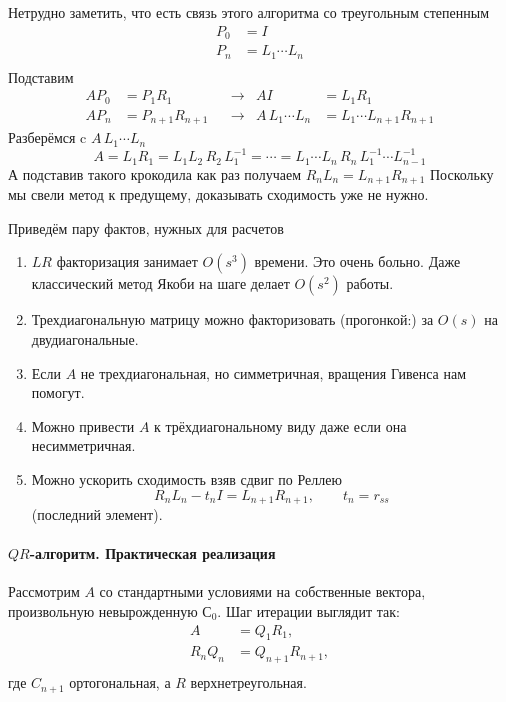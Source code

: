 \documentclass{trlnotes}
\begin{document}
Нетрудно заметить, что есть связь этого алгоритма со треугольным степенным
\[
  \begin{aligned}
    P_0 &= I \\
    P_n &= L_{1} \dotsm L_n \\
  \end{aligned}
\]
Подставим 
\[
  \begin{aligned}
    A P_0 &= P_1 R_1         & &\to& A I &= L_1 R_1 \\
    A P_n &= P_{n+1} R_{n+1} & &\to& A\, L_1 \dotsm L_n &= L_1 \dotsm L_{n+1} R_{n+1}
  \end{aligned}
\]
Разберёмся c $A\, L_1 \dotsm L_n$
\[
  A = L_1 R_1 = L_1 L_2 \, R_2 \, L_1^{-1} = \dotsb
  = L_1 \dotsm L_n \, R_n  \, L_1^{-1} \dotsm L_{n-1}^{-1}
\]
А подставив такого крокодила как раз получаем $R_nL_n = L_{n+1}R_{n+1}$
Поскольку мы свели метод к предущему, доказывать сходимость уже не нужно.

Приведём пару фактов, нужных для расчетов
\begin{enumerate}
  \item $LR$ факторизация занимает $O(s^3)$ времени. Это очень больно.
    Даже классический метод Якоби на шаге делает $O(s^2)$ работы.
  \item Трехдиагональную матрицу можно факторизовать (прогонкой:) за
    $O(s)$ на двудиагональные.
  \item Если $A$ не трехдиагональная, но симметричная, вращения Гивенса нам помогут.
  \item Можно привести $A$ к трёхдиагональному виду даже если она несимметричная.
  \item Можно ускорить сходимость взяв сдвиг по Реллею
    \[
      R_n L_n - t_n I = L_{n+1} R_{n+1}, \qquad t_n = r_{ss}
    \]
    (последний элемент).
\end{enumerate}

\paragraph{$QR$-алгоритм. Практическая реализация}

\begin{defn}\label{defn:lin::iterspaceconv}
  Рассмотрим $A$ со стандартными условиями на собственные вектора, 
  произвольную невырожденную $С_0$.
  Шаг итерации выглядит так: 
  \[
    \begin{aligned}
      A &= Q_{1}R_{1}, \\
      R_n Q_n &= Q_{n+1}R_{n+1}, \\
    \end{aligned}
  \]где $C_{n+1}$ ортогональная, а $R$ верхнетреугольная.
\end{defn}
\end{document}
